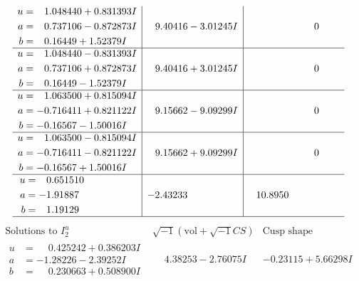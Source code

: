 \documentclass[1p]{elsarticle_modified}
\theoremstyle{definition}
\newcommand{\I}{\sqrt{-1}}
\begin{document}
$$\begin{array}{c|c|c}
\begin{aligned}
u &= \phantom{-}1.048440 + 0.831393 I \\
a &= \phantom{-}0.737106 - 0.872873 I \\
b &= \phantom{-}0.16449 + 1.52379 I\end{aligned}
 & \phantom{-}9.40416 - 3.01245 I & \phantom{-0.000000 } 0 \\ \hline\begin{aligned}
u &= \phantom{-}1.048440 - 0.831393 I \\
a &= \phantom{-}0.737106 + 0.872873 I \\
b &= \phantom{-}0.16449 - 1.52379 I\end{aligned}
 & \phantom{-}9.40416 + 3.01245 I & \phantom{-0.000000 } 0 \\ \hline\begin{aligned}
u &= \phantom{-}1.063500 + 0.815094 I \\
a &= -0.716411 + 0.821122 I \\
b &= -0.16567 - 1.50016 I\end{aligned}
 & \phantom{-}9.15662 - 9.09299 I & \phantom{-0.000000 } 0 \\ \hline\begin{aligned}
u &= \phantom{-}1.063500 - 0.815094 I \\
a &= -0.716411 - 0.821122 I \\
b &= -0.16567 + 1.50016 I\end{aligned}
 & \phantom{-}9.15662 + 9.09299 I & \phantom{-0.000000 } 0 \\ \hline\begin{aligned}
u &= \phantom{-}0.651510\phantom{ +0.000000I} \\
a &= -1.91887\phantom{ +0.000000I} \\
b &= \phantom{-}1.19129\phantom{ +0.000000I}\end{aligned}
 & -2.43233\phantom{ +0.000000I} & \phantom{-}10.8950\phantom{ +0.000000I}\\
 \hline 
 \end{array}$$\newpage$$\begin{array}{c|c|c}  
\text{Solutions to }I^u_{2}& \I (\text{vol} + \sqrt{-1}CS) & \text{Cusp shape}\\
 \hline 
\begin{aligned}
u &= \phantom{-}0.425242 + 0.386203 I \\
a &= -1.28226 - 2.39252 I \\
b &= \phantom{-}0.230663 + 0.508900 I\end{aligned}
 & \phantom{-}4.38253 - 2.76075 I & -0.23115 + 5.66298 I \\ \hline\begin{aligned}

\end{aligned}
\end{array}$$
\end{document}
